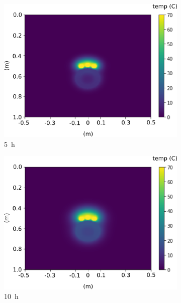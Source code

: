 \documentclass[Journal,letterpaper,InsideFigs]{ascelike-new}
\begin{document}
\begin{figure}
\begin{subfigure}[b]{0.49\textwidth}
    \includegraphics[width=\textwidth]{figs/time-evol/5h.png}
    \caption{\SI{5}{\hour}}
 \end{subfigure}             
 \begin{subfigure}[b]{0.49\textwidth}
    \includegraphics[width=\textwidth]{figs/time-evol/10h.png}
    \caption{\SI{10}{\hour}}
 \end{subfigure}   \\
 \begin{subfigure}[b]{0.49\textwidth}

\end{subfigure}
\end{figure}
\end{document}

